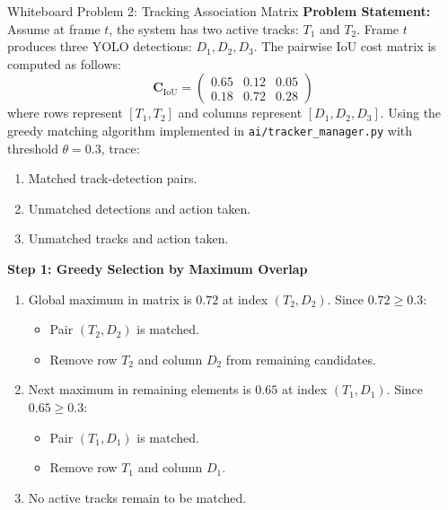 \documentclass[11pt,a4paper,oneside]{report}
\begin{document}
\begin{interviewq}{Whiteboard Problem 2: Tracking Association Matrix}
\textbf{Problem Statement:}
Assume at frame $t$, the system has two active tracks: $T_1$ and $T_2$. Frame $t$ produces three YOLO detections: $D_1, D_2, D_3$. The pairwise IoU cost matrix is computed as follows:
\begin{equation*}
\mathbf{C}_{\text{IoU}} =
\begin{pmatrix}
0.65 & 0.12 & 0.05 \\
0.18 & 0.72 & 0.28
\end{pmatrix}
\end{equation*}
where rows represent $[T_1, T_2]$ and columns represent $[D_1, D_2, D_3]$. Using the greedy matching algorithm implemented in \texttt{ai/tracker\_manager.py} with threshold $\theta = 0.3$, trace:
\begin{enumerate}
    \item Matched track-detection pairs.
    \item Unmatched detections and action taken.
    \item Unmatched tracks and action taken.
\end{enumerate}
\tcblower
\textbf{Step 1: Greedy Selection by Maximum Overlap}
\begin{enumerate}
    \item Global maximum in matrix is $\mathbf{0.72}$ at index $(T_2, D_2)$. Since $0.72 \ge 0.3$:
    \begin{itemize}
        \item Pair $(T_2, D_2)$ is matched.
        \item Remove row $T_2$ and column $D_2$ from remaining candidates.
    \end{itemize}
    \item Next maximum in remaining elements is $\mathbf{0.65}$ at index $(T_1, D_1)$. Since $0.65 \ge 0.3$:
    \begin{itemize}
        \item Pair $(T_1, D_1)$ is matched.
        \item Remove row $T_1$ and column $D_1$.
    \end{itemize}
    \item No active tracks remain to be matched.
\end{enumerate}


\end{interviewq}
\end{document}
